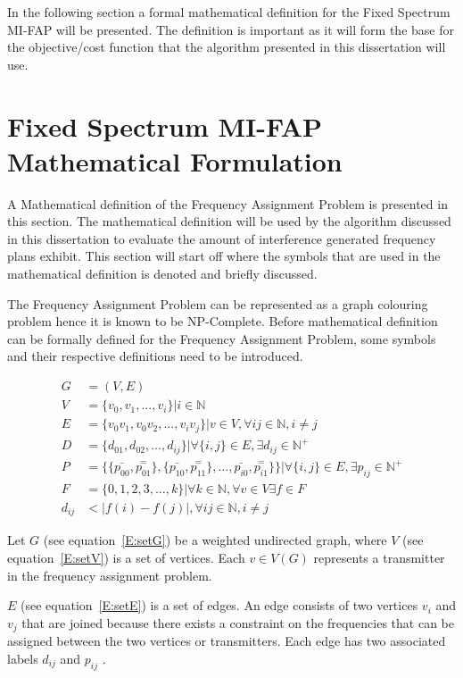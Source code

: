 In the following section a formal mathematical definition for the Fixed Spectrum MI-FAP will be presented. The definition is important as it will form the base for the objective/cost function that the algorithm presented in this dissertation will use.
\section{Fixed Spectrum MI-FAP Mathematical Formulation}
\label{sec:FAPMathDef}
A Mathematical definition of the Frequency Assignment Problem is presented in this section. The mathematical definition will be used by the algorithm discussed in this dissertation to evaluate the amount of interference generated frequency plans exhibit. This section will start off where the symbols that are used in the mathematical definition is denoted and briefly discussed.

The Frequency Assignment Problem can be represented as a graph colouring problem hence it is known to be NP-Complete. Before mathematical definition can be formally defined for the Frequency Assignment Problem, some symbols and their respective definitions need to be introduced.

\begin{align}
	G &= (V,E) \label{E:setG}\\
	V &= \{v_{0},v_{1},...,v_{i}\} | i \in \mathbb{N} \label{E:setV}\\
	E &= \{v_0v_1,v_0v_2,...,v_iv_j\}|v \in V,\forall ij \in \mathbb{N},i \neq j \label{E:setE}\\
	D &= \{d_{01},d_{02},...,d_{ij}\}| \forall\{i,j\} \in E, \exists d_{ij} \in \mathbb{N}^+ \label{E:setD}\\
	P &= \{\{\bar{p_{00}},\overset{=}{p_{01}}\},\{\bar{p_{10}},\overset{=}{p_{11}}\},\ldots,\bar{p_{i0}},\overset{=}{p_{i1}}\}\}| \forall \{i,j\} \in E,\exists p_{ij} \in \mathbb{N}^+ \label{E:setP}\\
	F &= \{0,1,2,3,...,k\}| \forall k \in \mathbb{N},\forall v \in V \exists f \in F\label{E:setF}\\
	d_{ij} &< |f(i) - f(j)|, \forall ij \in \mathbb{N},i \neq j \label{E:interference}
\end{align}

Let $G$ (see equation~\ref{E:setG}) be a weighted undirected graph, where $V$ (see equation~\ref{E:setV}) is a set of vertices. Each $v \in V(G)$ represents a transmitter in the frequency assignment problem. 

$E$ (see equation~\ref{E:setE}) is a set of edges. An edge consists of two vertices $v_i$ and $v_j$ that are joined because there exists a constraint on the frequencies that can be assigned between the two vertices or transmitters. Each edge has two associated labels $d_{ij}$ and $p_{ij}$ \cite{FAPOrientationModel,TabuMontemanniSmith}. 

